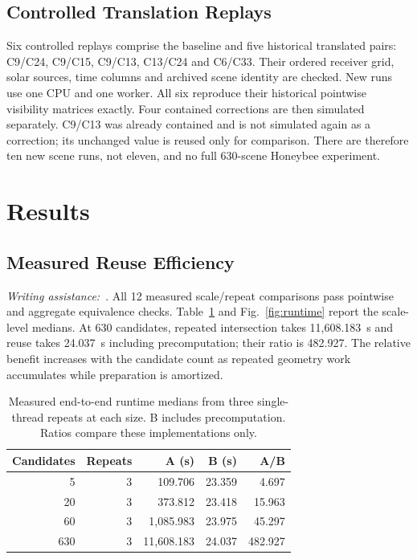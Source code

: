 \documentclass{llncs}
\newcommand{\aidraft}{\textit{Writing assistance:}~\cite{openai2026}. }
\begin{document}
\subsection{Controlled Translation Replays}
Six controlled replays comprise the baseline and five historical translated pairs: C9/C24, C9/C15, C9/C13, C13/C24 and C6/C33. Their ordered receiver grid, solar sources, time columns and archived scene identity are checked. New runs use one CPU and one worker. All six reproduce their historical pointwise visibility matrices exactly. Four contained corrections are then simulated separately. C9/C13 was already contained and is not simulated again as a correction; its unchanged value is reused only for comparison. There are therefore ten new scene runs, not eleven, and no full 630-scene Honeybee experiment.

\section{Results}
\subsection{Measured Reuse Efficiency}
\aidraft{}All 12 measured scale/repeat comparisons pass pointwise and aggregate equivalence checks. Table~\ref{tab:runtime} and Fig.~\ref{fig:runtime} report the scale-level medians. At 630 candidates, repeated intersection takes 11,608.183~s and reuse takes 24.037~s including precomputation; their ratio is 482.927. The relative benefit increases with the candidate count as repeated geometry work accumulates while preparation is amortized.

\begin{table}[tbp]
\caption{Measured end-to-end runtime medians from three single-thread repeats at each size. B includes precomputation. Ratios compare these implementations only.}
\label{tab:runtime}\centering
\begin{tabular}{rrrrr}\toprule
Candidates & Repeats & A (s) & B (s) & A/B\\\midrule
5 & 3 & 109.706 & 23.359 & 4.697\\
20 & 3 & 373.812 & 23.418 & 15.963\\
60 & 3 & 1,085.983 & 23.975 & 45.297\\
630 & 3 & 11,608.183 & 24.037 & 482.927\\\bottomrule
\end{tabular}
\end{table}
\end{document}
